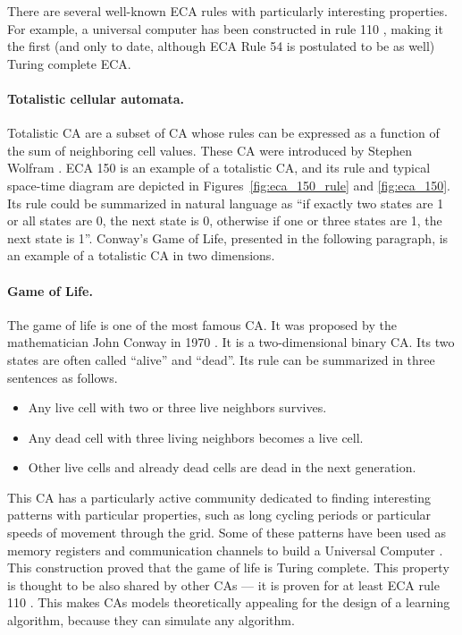 There are several well-known \ac{ECA} rules with particularly interesting
properties. For example, a universal computer has been constructed in rule 110
\parencite{cookUniversalityElementaryCellular2004}, making it the first (and
only to date, although \ac{ECA} Rule 54 is postulated to be as well) Turing complete \ac{ECA}.

\paragraph{Totalistic cellular automata.}
Totalistic \ac{CA} are a subset of \ac{CA} whose rules can be expressed as a
function of the sum of neighboring cell values. These \ac{CA} were introduced by
Stephen Wolfram \parencite{wolframStatisticalMechanicsCellular1983}. \ac{ECA} 150 is 
an example of a totalistic \ac{CA}, and its rule and typical space-time diagram are depicted in Figures~\ref{fig:eca_150_rule} and \ref{fig:eca_150}. Its rule could be summarized 
in natural language as 
``if exactly two states are 1 or all states are 0, the next state is 0, otherwise if 
one or three states are 1, the next state is 1''. Conway's Game of Life, presented 
in the following paragraph, is an example
of a totalistic \ac{CA} in two dimensions.

\paragraph{Game of Life.\label{sec:game-life}}
The game of life is one of the most famous \ac{CA}. It was proposed by the
mathematician John Conway in 1970 \parencite{gardnerMathematicalGames1970}. It
is a two-dimensional binary \ac{CA}. Its two states are often called ``alive''
and ``dead''. Its rule can be summarized in three sentences as follows.
\begin{itemize}
  \item Any live cell with two or three live neighbors survives.
  \item Any dead cell with three living neighbors becomes a live cell.
  \item Other live cells and already dead cells are dead in the next generation.
\end{itemize}
This \ac{CA} has a particularly active community dedicated to finding
interesting patterns with particular properties, such as long cycling periods or
particular speeds of movement through the grid. Some of these patterns have been
used as memory registers and communication channels to build a Universal
Computer \parencite{IgblanLifeUniversal}. This construction proved that the game
of life is Turing complete. This property is thought to be also shared by other
\acp{CA} --- it is proven for at least \ac{ECA} rule 110
\parencite{cookUniversalityElementaryCellular2004}. This makes \acp{CA}
models theoretically appealing for the design of a learning algorithm, because
they can simulate any algorithm.

